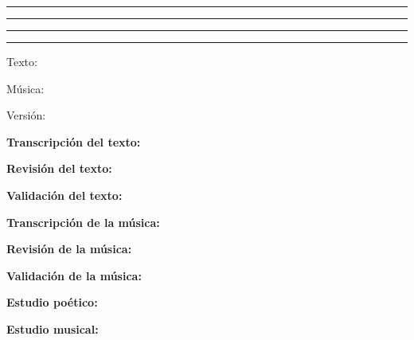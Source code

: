 \begin{titlepage} %
	\begin{center}
  \vspace*{\baselineskip} %
  \rule{\textwidth}{1.6pt}\vspace*{-\baselineskip}\vspace*{2pt} %
  \rule{\textwidth}{0.4pt} %
  \vspace{0.75\baselineskip} %
  \mytitle
  \vspace{0.75\baselineskip} %
  \rule{\textwidth}{0.4pt}\vspace*{-\baselineskip}\vspace{3.2pt} %
  \rule{\textwidth}{1.6pt} %
  \vspace{5\baselineskip} %

{\Large Texto: \mytext 

Música: \mymusic}
\end{center}

\vspace{10\baselineskip} %
\begin{flushleft}
Versión: \myversion

\textbf{Transcripción del texto:} \mytexttranscription

\textbf{Revisión del texto:} \mytextproofreading

\textbf{Validación del texto:} \mytextvalidation

\textbf{Transcripción de la música:} \mymusictranscription

\textbf{Revisión de la música:} \mymusicproofreading

\textbf{Validación de la música:} \mymusicvalidation

\textbf{Estudio poético:} \mypoeticstudy

\textbf{Estudio musical:} \mymusicalstudy 
\end{flushleft}
\end{titlepage}



